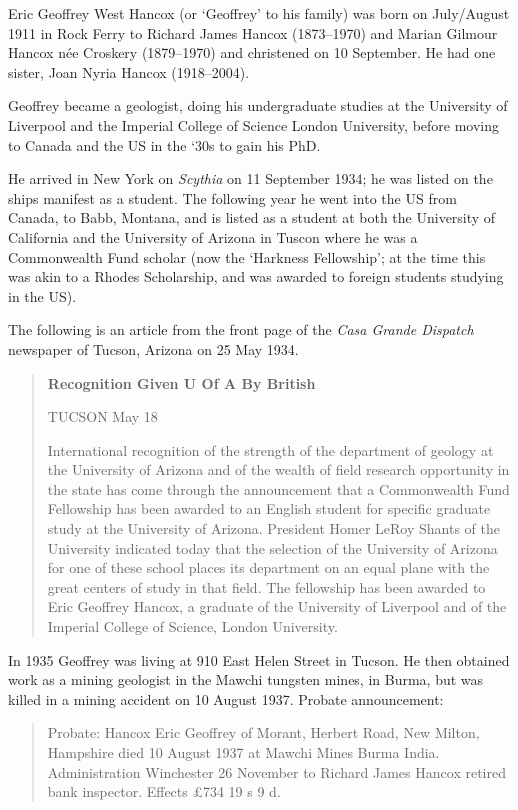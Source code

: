 
Eric Geoffrey West Hancox (or `Geoffrey' to his family) was  born on July/August 1911 in Rock Ferry\cite{EGWHbirth} to Richard James Hancox (1873--1970) and Marian Gilmour Hancox n\'{e}e Croskery (1879--1970) and christened on 10 September.\cite{EGWHchristening} He had one sister, Joan Nyria Hancox (1918--2004).

Geoffrey became a geologist, doing his undergraduate studies at the University of Liverpool and the Imperial College of Science London University, before moving to Canada and the US in the `30s to gain his PhD.

He arrived in New York on \emph{Scythia} on 11 September 1934; he was listed on the ships manifest as a student.\cite{NYpassengers}
The following year he went into the US from Canada, to Babb, Montana, and is listed as a student at both the University of California
and the University of Arizona in Tuscon\cite{USCanadaBorderCrossings} where he was a Commonwealth Fund scholar
(now the `Harkness Fellowship'; at the time this was akin to a Rhodes Scholarship, and was awarded to foreign students studying in the US).

The following is an article from the front page of the \emph{Casa Grande Dispatch} newspaper of Tucson, Arizona on 25 May 1934.\cite{CasaP1}

\begin{quotation}
\textbf{Recognition Given U Of A By British}

TUCSON May 18

International recognition of the strength of the department of geology at the University of Arizona and of the wealth of field research opportunity in the state has come through the announcement that a Commonwealth Fund Fellowship has been awarded to an English student for specific graduate study at the University of Arizona. President Homer LeRoy Shants of the University indicated today that the selection of the University of Arizona for one of these school places its department on an equal plane with the great centers of study in that field. The fellowship has been awarded to Eric Geoffrey Hancox, a graduate of the University of Liverpool and of the Imperial College of Science, London University.
\end{quotation}

In 1935 Geoffrey was living at 910 East Helen Street in Tucson.\cite{USCities}
He then obtained work as a mining geologist in  the Mawchi tungsten mines, in Burma, but was killed in a mining accident on 10 August 1937.
Probate announcement:\cite{NationalProbateCalendar}
\begin{quotation}
Probate: Hancox Eric Geoffrey of Morant, Herbert Road, New Milton, Hampshire died 10 August 1937 at Mawchi Mines Burma India. Administration Winchester 26 November to Richard James Hancox retired bank inspector. Effects \pounds734 19 s 9 d.
\end{quotation}
